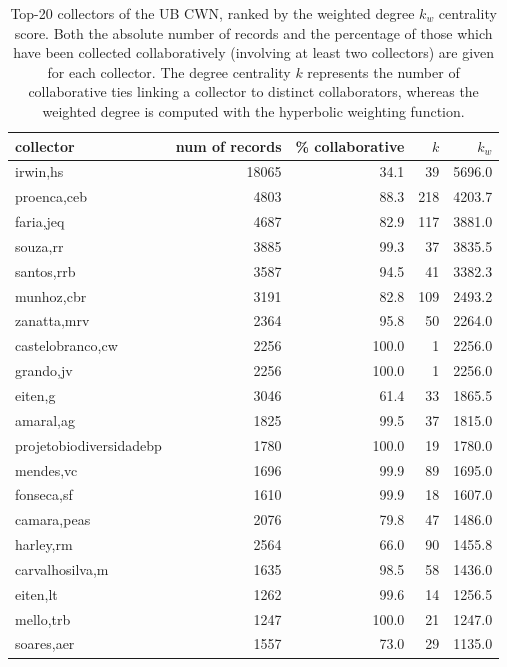 \begin{table}[t]
  \caption[Top-20 collectors of the UB CWN, ranked by the weighted degree centrality score.]{Top-20 collectors of the UB CWN, ranked by the weighted degree $k_w$ centrality score. Both the absolute number of records and the percentage of those which have been collected collaboratively (involving at least two collectors) are given for each collector. The degree centrality $k$ represents the number of collaborative ties linking a collector to distinct collaborators, whereas the weighted degree is computed with the hyperbolic weighting function.}
  \begin{center}
  \begin{tabular}{l r r r r}
      collector & num of records & \% collaborative & $k$ & $k_w$ \\
      \hline
      irwin,hs & 18065 & 34.1 & 39 & 5696.0 \\
      proenca,ceb & 4803 & 88.3 & 218 & 4203.7 \\
      faria,jeq & 4687 & 82.9 & 117 & 3881.0 \\
      souza,rr & 3885 & 99.3 & 37 & 3835.5 \\
      santos,rrb & 3587 & 94.5 & 41 & 3382.3 \\
      munhoz,cbr & 3191 & 82.8 & 109 & 2493.2 \\
      zanatta,mrv & 2364 & 95.8 & 50 & 2264.0 \\
      castelobranco,cw & 2256 & 100.0 & 1 & 2256.0 \\
      grando,jv & 2256 & 100.0 & 1 & 2256.0 \\
      eiten,g & 3046 & 61.4 & 33 & 1865.5 \\
      amaral,ag & 1825 & 99.5 & 37 & 1815.0 \\
      projetobiodiversidadebp & 1780 & 100.0 & 19 & 1780.0 \\
      mendes,vc & 1696 & 99.9 & 89 & 1695.0 \\
      fonseca,sf & 1610 & 99.9 & 18 & 1607.0 \\
      camara,peas & 2076 & 79.8 & 47 & 1486.0 \\
      harley,rm & 2564 & 66.0 & 90 & 1455.8 \\
      carvalhosilva,m & 1635 & 98.5 & 58 & 1436.0 \\
      eiten,lt & 1262 & 99.6 & 14 & 1256.5 \\
      mello,trb & 1247 & 100.0 & 21 & 1247.0 \\
      soares,aer & 1557 & 73.0 & 29 & 1135.0 \\
      \hline
  \end{tabular}
  \label{table:ub_cwn_degree}
  \end{center}
\end{table}
